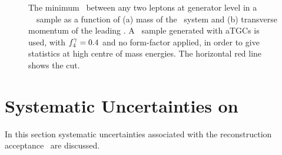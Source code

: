 \begin{figure}[h]
\centering
    \caption[Effect of the  requirement on sensitivity to boosted
    \fourlep\ systems.]{The minimum \deltaR\ between any two leptons at
    generator level in a \fourlep\
    \mc\ sample as a function of (a) mass of the
    \fourlep\ system and (b) transverse momentum of the leading \Z. A \ZZllll\
    sample generated with aTGCs is used, with $f_{4}^{\gamma}=0.4$ and no form-factor
    applied, in order to give statistics at high centre
    of mass energies. The
    horizontal red line shows the \deltaRlt{0.2} cut. }
\label{fig:objSel-deltaRcutoff} 
\end{figure}

\section{Systematic Uncertainties on \CZZ}

In this section systematic uncertainties associated with the reconstruction
acceptance \CZZ\ are discussed. %

